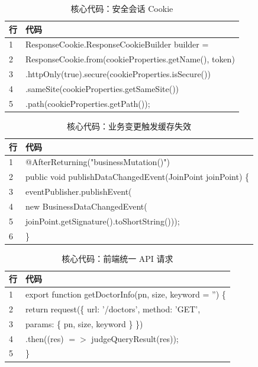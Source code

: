 \documentclass[UTF8,a4paper,12pt,openany,fontset=windows]{ctexrep}
\newcommand{\codefont}{\ttfamily\footnotesize}
\begin{document}
\begin{table}[H]
  \centering
  \caption{核心代码：安全会话 Cookie}
  \begin{tabularx}{\textwidth}{p{1.2cm}L}
    \toprule
    行 & 代码 \\
     & \codefont ResponseCookie.ResponseCookieBuilder builder = \\
    2 & \codefont \quad ResponseCookie.from(cookieProperties.getName(), token) \\
    3 & \codefont \quad .httpOnly(true).secure(cookieProperties.isSecure()) \\
    4 & \codefont \quad .sameSite(cookieProperties.getSameSite()) \\
    5 & \codefont \quad .path(cookieProperties.getPath()); \\
    \bottomrule
  \end{tabularx}
\end{table}

\begin{table}[H]
  \centering
  \caption{核心代码：业务变更触发缓存失效}
  \begin{tabularx}{\textwidth}{p{1.2cm}L}
    \toprule
    行 & 代码 \\
     & \codefont @AfterReturning("businessMutation()") \\
    2 & \codefont public void publishDataChangedEvent(JoinPoint joinPoint) \{ \\
    3 & \codefont \quad eventPublisher.publishEvent( \\
    4 & \codefont \quad\quad new BusinessDataChangedEvent( \\
    5 & \codefont \quad\quad joinPoint.getSignature().toShortString())); \\
    6 & \codefont \} \\
    \bottomrule
  \end{tabularx}
\end{table}

\begin{table}[H]
  \centering
  \caption{核心代码：前端统一 API 请求}
  \begin{tabularx}{\textwidth}{p{1.2cm}L}
    \toprule
    行 & 代码 \\
     & \codefont export function getDoctorInfo(pn, size, keyword = '') \{ \\
    2 & \codefont \quad return request(\{ url: '/doctors', method: 'GET', \\
    3 & \codefont \quad\quad params: \{ pn, size, keyword \} \}) \\
    4 & \codefont \quad\quad .then((res) $=>$ judgeQueryResult(res)); \\
    5 & \codefont \} \\
    \bottomrule
  \end{tabularx}
\end{table}
\end{document}
